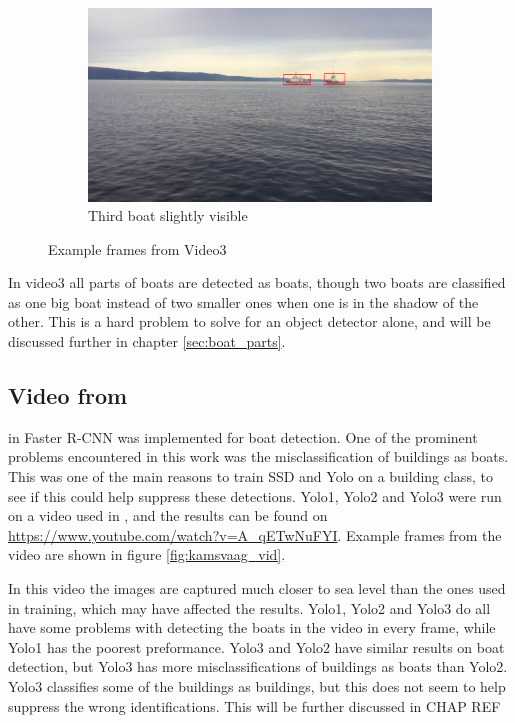 \begin{figure}[h!]
\begin{subfigure}[b]{0.78\textwidth}
   \includegraphics[width=1\linewidth]{results/video/video3/frame208.jpg}
   \caption{Third boat slightly visible}
   \label{fig:video3_slightly}
\end{subfigure}
\caption{Example frames from Video3}
\label{fig:video3}
\end{figure}

\newpage

In video3 all parts of boats are detected as boats, though two boats are classified as one big boat instead of two smaller ones when one is in the shadow of the other. This is a hard problem to solve for an object detector alone, and will be discussed further in chapter \ref{sec:boat_parts}. 


\subsection{Video from \citep{Kamsvag2018}}

in \citep{Kamsvag2018} Faster R-CNN was implemented for boat detection. One of the prominent problems encountered in this work was the misclassification of buildings as boats. This was one of the main reasons to train SSD and Yolo on a building class, to see if this could help suppress these detections. Yolo1, Yolo2 and Yolo3 were run on a video used in \citep{Kamsvag2018}, and the results can be found on \url{https://www.youtube.com/watch?v=A_qETwNuFYI}. Example frames from the video are shown in figure \ref{fig:kamsvaag_vid}.

\vspace{3mm}

In this video the images are captured much closer to sea level than the ones used in training, which may have affected the results. Yolo1, Yolo2 and Yolo3 do all have some problems with detecting the boats in the video in every frame, while Yolo1 has the poorest preformance. Yolo3 and Yolo2 have similar results on boat detection, but Yolo3 has more misclassifications of buildings as boats than Yolo2. Yolo3 classifies some of the buildings as buildings, but this does not seem to help suppress the wrong identifications. This will be further discussed in CHAP REF

